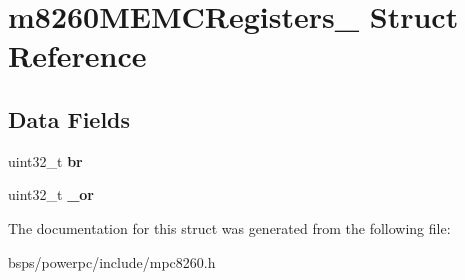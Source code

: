 \hypertarget{structm8260MEMCRegisters__}{}\section{m8260\+M\+E\+M\+C\+Registers\+\_\+ Struct Reference}
\label{structm8260MEMCRegisters__}
\subsection*{Data Fields}
\begin{DoxyCompactItemize}
\item 
\mbox{\label{structm8260MEMCRegisters___ab573c4635c8466ef2611392e6caf19aa}} 
uint32\+\_\+t {\bfseries br}
\item 
\mbox{\label{structm8260MEMCRegisters___a9e1e3d201125f8ba4e712046ab3d73f6}} 
uint32\+\_\+t {\bfseries \+\_\+or}
\end{DoxyCompactItemize}


The documentation for this struct was generated from the following file\+:\begin{DoxyCompactItemize}
\item 
bsps/powerpc/include/mpc8260.\+h\end{DoxyCompactItemize}

